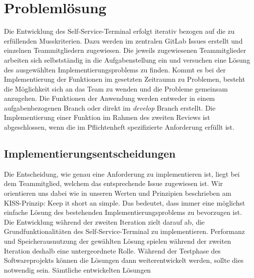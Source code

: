 \section{Problemlösung}
Die Entwicklung des Self-Service-Terminal erfolgt iterativ bezogen auf die zu erfüllenden Musskriterien. Dazu werden im zentralen GitLab Issues erstellt und einzelnen Teammitgliedern zugewiesen. Die jeweils zugewiesenen Teammitglieder arbeiten sich selbstständig in die Aufgabenstellung ein und versuchen eine Lösung des ausgewählten Implementierungsproblems zu finden. Kommt es bei der Implementierung der Funktionen im gesetzten Zeitraumn zu Problemen, besteht die Möglichkeit sich an das Team zu wenden und die Probleme gemeinsam anzugehen. Die Funktionen der Anwendung werden entweder in einem aufgabenbezogenen Branch oder direkt im \textit{develop} Branch erstellt. Die Implementierung einer Funktion im Rahmen des zweiten Reviews ist abgeschlossen, wenn die im Pflichtenheft spezifizierte Anforderung erfüllt ist.

\subsection{Implementierungsentscheidungen}
Die Entscheidung, wie genau eine Anforderung zu implementieren ist, liegt bei dem Teammitglied, welchem das entsprechende Issue zugewiesen ist. Wir orientieren uns dabei wie in unseren Werten und Prinzipien beschrieben am KISS-Prinzip: \glqq Keep it short an simple\grqq{}. Das bedeutet, dass immer eine möglichst einfache Lösung des bestehenden Implementierungsproblems zu bevorzugen ist. Die Entwicklung während der zweiten Iteration zielt darauf ab, die Grundfunktionalitäten des Self-Service-Terminal zu implementieren. Performanz und Speicherausnutzung der gewählten Lösung spielen während der zweiten Iteration deshalb eine untergeordnete Rolle. Während der Testphase des Softwareprojekts können die Lösungen dann weiterentwickelt werden, sollte dies notwendig sein. Sämtliche entwickelten Lösungen 
